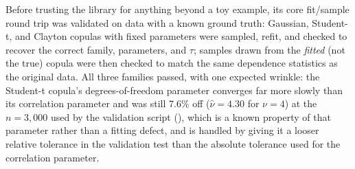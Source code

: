 \documentclass[
  english,
  class=report,
  accentcolor=2c,
  marginpar=false,
  parskip=half-,
  fontsize=11pt,
  ruledheaders=false,
  pdfa=false,
  IMRAD=false,
  thesis={type=master}
]{tudapub}
\begin{document}
Before trusting the library for anything beyond a toy example, its core
fit/sample round trip was validated on data with a known ground truth:
Gaussian, Student-t, and Clayton copulas with fixed parameters were sampled,
refit, and checked to recover the correct family, parameters, and $\tau$;
samples drawn from the \emph{fitted} (not the true) copula were then checked
to match the same dependence statistics as the original data. All three
families passed, with one expected wrinkle: the Student-t copula's
degrees-of-freedom parameter converges far more slowly than its correlation
parameter and was still 7.6\% off ($\hat\nu = 4.30$ for $\nu = 4$) at the
$n = 3{,}000$ used by the validation script (), which
is a known property of that parameter rather than a fitting defect, and is
handled by
giving it a looser relative tolerance in the validation test than the
absolute tolerance used for the correlation parameter.
\end{document}
